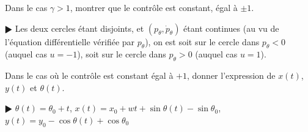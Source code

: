 \documentclass[11pt,a4paper]{article}
\theoremstyle{plain}
\theoremstyle{definition}
\begin{document}
\begin{Exercice}[10 points]
\begin{Question} Dans le cas $\gamma > 1$, montrer que le contr\^ole est constant,
\'egal \`a $\pm 1$.
\end{Question}
\begin{corr} $\RHD$ Les deux cercles \'etant disjoints, et $(p_\theta,\dot{p}_\theta)$
\'etant continues (au vu de l'\'equation diff\'erentielle v\'erifi\'ee par
$p_\theta$), on est soit sur le cercle dans $p_\theta<0$ (auquel cas $u=-1$), soit sur
le cercle dans $p_\theta>0$ (auquel cas $u=1$).
\end{corr}

\begin{Question} Dans le cas o\`u le contr\^ole est constant \'egal \`a $+1$, donner
l'expression de $x(t)$, $y(t)$ et $\theta(t)$.
\end{Question}
\begin{corr} $\RHD$ $\theta(t)=\theta_0+t$, $x(t)=x_0+wt+\sin\theta(t)-\sin\theta_0$,
$y(t)=y_0-\cos\theta(t)+\cos\theta_0$
\end{corr}

\end{Exercice}
\end{document}
